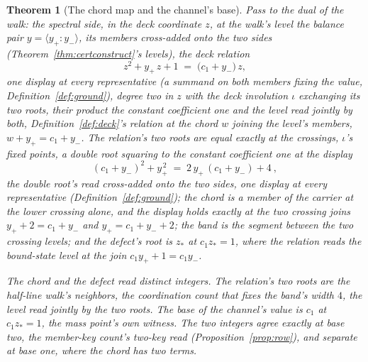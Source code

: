 \documentclass[11pt]{article}
\newtheorem{theorem}{Theorem}
\theoremstyle{definition}
\begin{document}
\begin{theorem}[The chord map and the channel's base]\label{thm:chordmap}
Pass to the dual of the walk: the spectral side, in the deck
coordinate $z$, at the walk's level the balance pair
$y=\langle y_+\!:\!y_-\rangle$, its members cross-added onto the two
sides (Theorem~\ref{thm:certconstruct}'s levels), the \emph{deck
relation}
\[
z^2+y_+\,z+1\;=\;\big(c_1+y_-\big)\,z ,
\]
one display at every representative (a summand on both members
fixing the value, Definition~\ref{def:ground}),
degree two in $z$ with the \emph{deck involution} $\iota$ exchanging
its two roots, their product the constant coefficient one and
the level read jointly by both, Definition~\ref{def:deck}'s
relation at the chord $w$ joining the level's members,
$w+y_+=c_1+y_-$. The relation's
two roots are equal exactly at the \emph{crossings}, $\iota$'s fixed
points, a double root squaring to the constant coefficient one at
the display
\[
(c_1+y_-)^2+y_+^{\,2}\;=\;2\,y_+\,(c_1+y_-)+4\ ,
\]
the double root's read cross-added onto the two sides, one display
at every representative (Definition~\ref{def:ground}); the chord
is a member of the carrier at the lower crossing alone, and the
display holds
exactly at the
two crossing joins $y_++2=c_1+y_-$ and $y_+=c_1+y_-+2$; the \emph{band}
is the segment between the two crossing levels;
and the defect's root is $z_*$ at $c_1z_*=1$, where the relation
reads the bound-state level at the join $c_1y_++1=c_1y_-$.

\emph{The chord and the defect read distinct integers.} The
relation's two roots are the half-line walk's neighbors, the
coordination count that
fixes the band's width $4$, the level read jointly by the two
roots. The base of the
channel's value
is $c_1$ at $c_1z_*=1$, the mass point's own witness. The two integers
agree exactly at base two, the member-key count's two-key read
(Proposition~\ref{prop:row}), and separate at base one, where the
chord has two terms.
\end{theorem}
\end{document}
